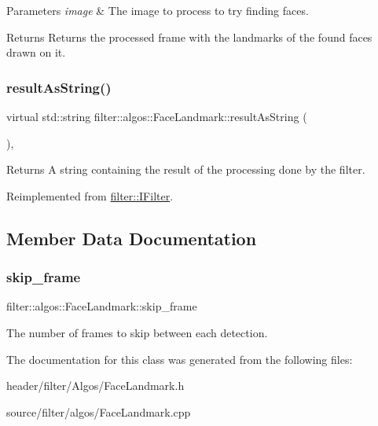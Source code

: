 \begin{DoxyParams}{Parameters}
{\em image} & The image to process to try finding faces. \\
\hline
\end{DoxyParams}
\begin{DoxyReturn}{Returns}
Returns the processed frame with the landmarks of the found faces drawn on it. 
\end{DoxyReturn}
\mbox{\label{classfilter_1_1algos_1_1_face_landmark_a58eca9d87717bac1696c2b008af4342a}} 
\subsubsection{\texorpdfstring{result\+As\+String()}{resultAsString()}}
{\footnotesize\ttfamily virtual std\+::string filter\+::algos\+::\+Face\+Landmark\+::result\+As\+String (\begin{DoxyParamCaption}{ }\end{DoxyParamCaption})\hspace{0.3cm}{\ttfamily [inline]}, {\ttfamily [virtual]}}

\begin{DoxyReturn}{Returns}
A string containing the result of the processing done by the filter. 
\end{DoxyReturn}


Reimplemented from \hyperlink{classfilter_1_1_i_filter_ab99902b060a6d9edc3452a8c9f85e37e}{filter\+::\+I\+Filter}.



\subsection{Member Data Documentation}
\mbox{\label{classfilter_1_1algos_1_1_face_landmark_a6fe568dc4782d0e560947dab7417dab4}} 
\subsubsection{\texorpdfstring{skip\+\_\+frame}{skip\_frame}}
{\footnotesize\ttfamily filter\+::algos\+::\+Face\+Landmark\+::skip\+\_\+frame}

The number of frames to skip between each detection. 

The documentation for this class was generated from the following files\+:\begin{DoxyCompactItemize}
\item 
header/filter/\+Algos/Face\+Landmark.\+h\item 
source/filter/algos/Face\+Landmark.\+cpp\end{DoxyCompactItemize}
